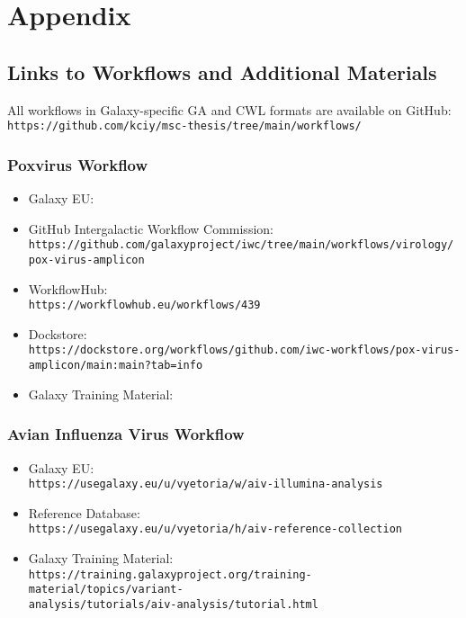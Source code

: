 \chapter*{Appendix}
\label{chap:appendix}

\section*{\thesection \quad Links to Workflows and Additional Materials}
\hspace*{-18pt}All workflows in Galaxy-specific GA and CWL formats are available on GitHub:\\
\texttt{https://github.com/kciy/msc-thesis/tree/main/workflows/}

\subsection*{\thesubsection \quad Poxvirus Workflow}
\label{sec:apx-pox-links}
\begin{itemize}
	\setlength{\itemsep}{-0.4cm}
	\item Galaxy EU: \todoit
	\item GitHub Intergalactic Workflow Commission:\\
	\texttt{https://github.com/galaxyproject/iwc/tree/main/workflows/virology/\\pox-virus-amplicon}
	\item WorkflowHub:\\
	\texttt{https://workflowhub.eu/workflows/439}
	\item Dockstore:\\
	\texttt{https://dockstore.org/workflows/github.com/iwc-workflows/pox-virus-\\amplicon/main:main?tab=info}
	\item Galaxy Training Material: \todoit
\end{itemize}

\subsection*{\thesubsection \quad Avian Influenza Virus Workflow}
\label{sec:apx-aiv-links}

\begin{itemize}
	\setlength{\itemsep}{-0.4cm}
	\item Galaxy EU:\\
	\texttt{https://usegalaxy.eu/u/vyetoria/w/aiv-illumina-analysis}
	\item Reference Database:\\ 
	\texttt{https://usegalaxy.eu/u/vyetoria/h/aiv-reference-collection}
	\item Galaxy Training Material:\\
	\texttt{https://training.galaxyproject.org/training-material/topics/variant-\\analysis/tutorials/aiv-analysis/tutorial.html}
\end{itemize}


